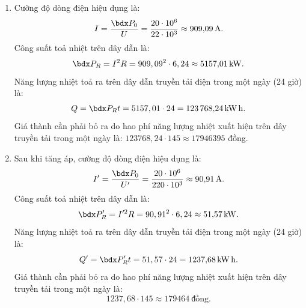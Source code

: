 \begin{ex}
{\begin{enumerate}[label=\alph*)]
			\item Cường độ dòng điện hiệu dụng là:
			$$
			I=\frac{\calP_0}{U}=\frac{20 \cdot 10^6}{22 \cdot 10^3} \approx \SI{909.09}{\ampere}.
			$$
			Công suất toả nhiệt trên dây dẫn là:
			$$
			\calP_R=I^2 R=909,09^2 \cdot 6,24 \approx \SI{5157.01}{\kilo\watt}.
			$$
			Năng lượng nhiệt toả ra trên dây dẫn truyền tải điện trong một ngày (24 giờ) là:
			$$
			Q=\calP_R t=5157,01\cdot24= \SI{123768.24}{\kilo\watt\hour}.
			$$
			Giá thành cần phải bỏ ra do hao phí năng lượng nhiệt xuất hiện trên dây truyền tải trong một ngày là: $123768,24\cdot145 \approx 17946395$ đồng.
			\item Sau khi tăng áp, cường độ dòng điện hiệu dụng là:
			$$
			I^{\prime}=\dfrac{\calP_0}{U^{\prime}}=\frac{20\cdot10^6}{220\cdot10^3} \approx \SI{90.91}{\ampere}.
			$$
			Công suất toả nhiệt trên dây dẫn là:
			$$
			\calP_R^{\prime}=I^{\prime 2} R=90,91^2\cdot6,24 \approx \SI{51.57}{\kilo\watt}.
			$$
			Năng lượng nhiệt toả ra trên dây dẫn truyền tải điện trong một ngày (24 giờ) là:
			$$
			Q^{\prime}=\calP_R^{\prime} t=51,57\cdot24= \SI{1237.68}{\kilo\watt\hour}.
			$$
			Giá thành cần phải bỏ ra do hao phí năng lượng nhiệt xuất hiện trên dây truyền tải trong một ngày là:
			$$
			1237,68\cdot145\approx \SI{179464}{\text{đồng}}.
			$$
			
		\end{enumerate}
	}
\end{ex}
